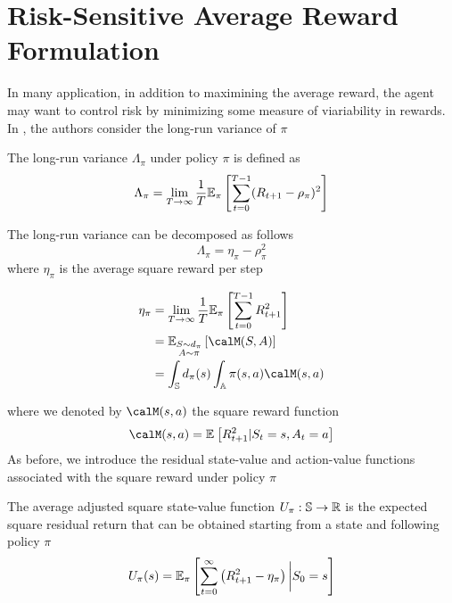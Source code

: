 \section{Risk-Sensitive Average Reward Formulation}
In many application, in addition to maximining the average reward, the agent
may want to control risk by minimizing some measure of viariability in rewards.
In \cite{prashanth2014actor}, the authors consider the long-run variance of
$\pi$
\begin{definition}
	The long-run variance $\Lambda_\pi$ under policy $\pi$ is defined as
	\begin{equation}
		\begin{split}
			\Lambda_\pi &= \lim_{T \to \infty} \frac{1}{T} \E[\pi]{
			\sum^{T-1}_{t=0} (R_{t+1} - \rho_\pi)^2}\\
		\end{split}
	\end{equation}
\end{definition}
The long-run variance can be decomposed as follows
\begin{equation}
	\Lambda_\pi = \eta_\pi - \rho_\pi^2 
\end{equation}
where $\eta_\pi$ is the average square reward per step  
\begin{definition}
	\begin{equation}
		\begin{split}
			\eta_\pi &= \lim_{T\to\infty}\frac{1}{T}\E[\pi]{\sum_{t=0}^{T-1} R_{t+1}^2}\\
					 &= \E[\substack{S\sim d_\pi \\ A \sim \pi}]{\calM(S,A)}\\	
					 &= \int_\S d_\pi(s) \int_\A \pi(s,a) \calM(s,a)\\
		\end{split}
	\end{equation}
\end{definition}
where we denoted by $\calM(s,a)$ the square reward function
\begin{equation}
	\calM(s,a) = \E{R_{t+1}^2 | S_t = s, A_t = a}
\end{equation}
As before, we introduce the residual state-value and action-value functions 
associated with the square reward under policy $\pi$
\begin{definition}
	The average adjusted square state-value function $U_\pi : \S \to \R$ is the
	expected square residual return that can be obtained starting from a state 
	and following policy $\pi$
	\begin{equation}
		U_\pi(s) = \E[\pi]{\sum^{\infty}_{t=0} \left(R_{t+1}^2 - \eta_\pi\right)
		\bigg| S_0 = s}
	\end{equation}
\end{definition}
